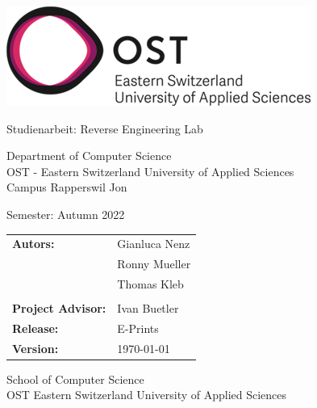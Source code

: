 \begin{titlepage}

    \begin{center}

        \includegraphics[height=0.15\textwidth, right]{resources/ost-logo.png}

        \vspace{1 cm}


        \vspace{0.5cm}

        {\Huge Studienarbeit: Reverse Engineering Lab}

        \vspace{0.5cm}

        

        \vspace{1 cm}

        Department of Computer Science \\
        OST - Eastern Switzerland University of Applied Sciences\\
        Campus Rapperswil Jon \\

        \vspace{1 cm}

        Semester: Autumn 2022

        \vspace{1 cm}
        
        \begin{table}[h!]
            \centering
            \begin{tabular}{@{}ll}
                \textbf{Autors:}    & Gianluca Nenz \\
                                          & Ronny Mueller \\
                                          & Thomas Kleb \\
                                          &                    \\
                \textbf{Project Advisor:} & Ivan Buetler \\
                \textbf{Release:} & E-Prints \\
                \textbf{Version:} & \today
            \end{tabular}
        \end{table}
        

        \vfill


        \vspace{1cm}
        School of Computer Science\\
        OST Eastern Switzerland University of Applied Sciences

    \end{center}

\end{titlepage}
